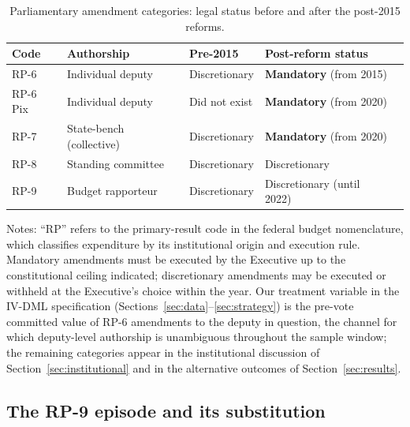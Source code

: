 \documentclass[preprint,12pt,authoryear]{elsarticle}
\begin{document}
\begin{table}[htbp]
\centering
\caption{Parliamentary amendment categories: legal status before and after the post-2015 reforms.}
\label{tab:rp_legal_status}
\begin{threeparttable}
\small
\setlength{\tabcolsep}{5pt}
\begin{tabular}{@{}lllll@{}}
\toprule
Code & Authorship              & Pre-2015        & Post-reform status \\
\midrule
RP-6     & Individual deputy       & Discretionary   & \textbf{Mandatory} (from 2015) \\
RP-6 Pix & Individual deputy       & Did not exist   & \textbf{Mandatory} (from 2020) \\
RP-7     & State-bench (collective)& Discretionary   & \textbf{Mandatory} (from 2020) \\
RP-8     & Standing committee      & Discretionary   & Discretionary \\
RP-9     & Budget rapporteur       & Discretionary   & Discretionary (until 2022) \\
\bottomrule
\end{tabular}
\begin{tablenotes}
\small
\item Notes: ``RP'' refers to the primary-result code in the federal budget nomenclature, which classifies expenditure by its institutional origin and execution rule. Mandatory amendments must be executed by the Executive up to the constitutional ceiling indicated; discretionary amendments may be executed or withheld at the Executive's choice within the year. Our treatment variable in the IV-DML specification (Sections~\ref{sec:data}--\ref{sec:strategy}) is the pre-vote committed value of RP-6 amendments to the deputy in question, the channel for which deputy-level authorship is unambiguous throughout the sample window; the remaining categories appear in the institutional discussion of Section~\ref{sec:institutional} and in the alternative outcomes of Section~\ref{sec:results}.
\end{tablenotes}
\end{threeparttable}
\end{table}

\subsection{The RP-9 episode and its substitution}
\label{subsec:rp9_episode}
\end{document}
